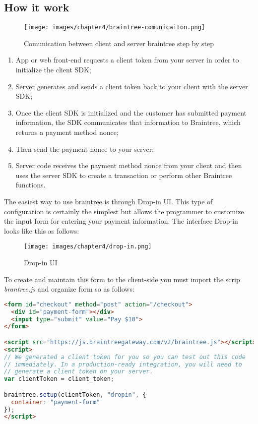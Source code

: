 \subsection{How it work}
\begin{figure}[htb]
  \centering
  \texttt{[image: images/chapter4/braintree-comunicaiton.png]}\hfill
  \caption[Interaction client-braintree]{Comunication between client and server braintree step by step}
  \label{fig:braintree_server_comunication}
\end{figure}
\begin{enumerate}
  \item App or web front-end requests a client token from your server in order to initialize the client SDK;
  \item Server generates and sends a client token back to your client with the server SDK;
  \item Once the client SDK is initialized and the customer has submitted payment information, the SDK communicates that information to Braintree, which returns a payment method nonce;
  \item Then send the payment nonce to your server;
  \item Server code receives the payment method nonce from your client and then uses the server SDK to create a transaction or perform other Braintree functions.
\end{enumerate}
The easiest way to use braintree is through Drop-in UI. This type of configuration is certainly the simplest but allows the programmer to customize the input form for entering your payment information. The interface Drop-in looks like this as follows:
\begin{figure}[htb]
  \centering
  \texttt{[image: images/chapter4/drop-in.png]}\hfill
  \caption[Drop-in UI]{ Drop-in UI}
  \label{fig:drop_in_ui}
\end{figure}
To create and maintain this form to the client-side you must import the scrip \emph{brantree.js} and organize form so as follows:
\begin{lstlisting}[language=html]
<form id="checkout" method="post" action="/checkout">
  <div id="payment-form"></div>
  <input type="submit" value="Pay $10">
</form>

<script src="https://js.braintreegateway.com/v2/braintree.js"></script>
<script>
// We generated a client token for you so you can test out this code
// immediately. In a production-ready integration, you will need to
// generate a client token on your server.
var clientToken = client_token;

braintree.setup(clientToken, "dropin", {
  container: "payment-form"
});
</script>
\end{lstlisting}
